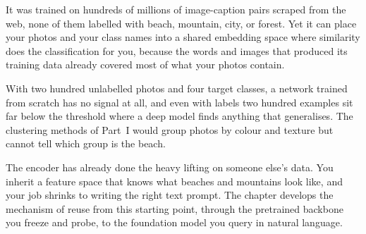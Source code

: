  It was trained on hundreds of millions of image-caption pairs scraped from the web, none of them labelled with beach, mountain, city, or forest. Yet it can place your photos and your class names into a shared embedding space where similarity does the classification for you, because the words and images that produced its training data already covered most of what your photos contain.

 With two hundred unlabelled photos and four target classes, a network trained from scratch has no signal at all, and even with labels two hundred examples sit far below the threshold where a deep model finds anything that generalises. The clustering methods of Part~I would group photos by colour and texture but cannot tell which group is the beach.

 The encoder has already done the heavy lifting on someone else's data. You inherit a feature space that knows what beaches and mountains look like, and your job shrinks to writing the right text prompt. The chapter develops the mechanism of reuse from this starting point, through the pretrained backbone you freeze and probe, to the foundation model you query in natural language.

\begin{marginfigure}
\centering
{}
\caption{The signature operation of transfer learning: a pretrained backbone is frozen and a small head is trained on top. Most of the chapter is variations on what to freeze, what to adapt, and how cheaply.}
\label{fig:transfer_signature}
\end{marginfigure}

